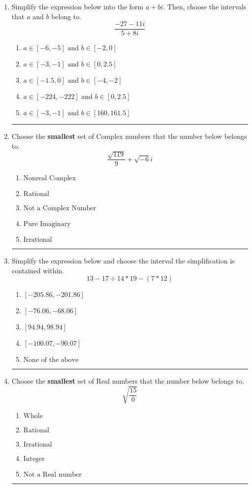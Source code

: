 \documentclass[14pt]{extbook}
\newcommand{\litem}[1]{\item#1\hspace*{-1cm}\rule{\textwidth}{0.4pt}}
\begin{document}
\begin{enumerate}
{\begin{enumerate}[label=\Alph*.]
\end{enumerate} }
\litem{
Simplify the expression below into the form $a+bi$. Then, choose the intervals that $a$ and $b$ belong to.\[ \frac{-27 - 11 i}{5 + 8 i} \]\begin{enumerate}[label=\Alph*.]
\item \( a \in [-6, -5] \text{ and } b \in [-2, 0] \)
\item \( a \in [-3, -1] \text{ and } b \in [0, 2.5] \)
\item \( a \in [-1.5, 0] \text{ and } b \in [-4, -2] \)
\item \( a \in [-224, -222] \text{ and } b \in [0, 2.5] \)
\item \( a \in [-3, -1] \text{ and } b \in [160, 161.5] \)

\end{enumerate} }
\litem{
Choose the \textbf{smallest} set of Complex numbers that the number below belongs to.\[ \frac{\sqrt{119}}{9}+\sqrt{-6}i \]\begin{enumerate}[label=\Alph*.]
\item \( \text{Nonreal Complex} \)
\item \( \text{Rational} \)
\item \( \text{Not a Complex Number} \)
\item \( \text{Pure Imaginary} \)
\item \( \text{Irrational} \)

\end{enumerate} }
\litem{
Simplify the expression below and choose the interval the simplification is contained within.\[ 13 - 17 \div 14 * 19 - (7 * 12) \]\begin{enumerate}[label=\Alph*.]
\item \( [-205.86, -201.86] \)
\item \( [-76.06, -68.06] \)
\item \( [94.94, 98.94] \)
\item \( [-100.07, -90.07] \)
\item \( \text{None of the above} \)

\end{enumerate} }
\litem{
Choose the \textbf{smallest} set of Real numbers that the number below belongs to.\[ \sqrt{\frac{15}{0}} \]\begin{enumerate}[label=\Alph*.]
\item \( \text{Whole} \)
\item \( \text{Rational} \)
\item \( \text{Irrational} \)
\item \( \text{Integer} \)
\item \( \text{Not a Real number} \)


\end{enumerate}}
\end{enumerate}
\end{document}
